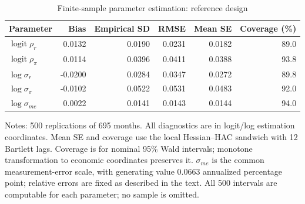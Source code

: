 \begin{table}[!htbp]
\centering
\caption{Finite-sample parameter estimation: reference design}
\label{oa:tab_parameter_mc_reference}
\begin{threeparttable}
\small
\begin{tabular*}{\textwidth}{@{\extracolsep{\fill}}lrrrrr}
\toprule
Parameter & Bias & Empirical SD & RMSE & Mean SE & Coverage (\%) \\
\midrule
$\operatorname{logit}\rho_r$ & 0.0132 & 0.0190 & 0.0231 & 0.0182 & 89.0 \\
$\operatorname{logit}\rho_\pi$ & 0.0114 & 0.0396 & 0.0411 & 0.0388 & 93.8 \\
$\log\sigma_r$ & -0.0200 & 0.0284 & 0.0347 & 0.0272 & 89.8 \\
$\log\sigma_\pi$ & -0.0102 & 0.0522 & 0.0531 & 0.0483 & 92.0 \\
$\log\sigma_{me}$ & 0.0022 & 0.0141 & 0.0143 & 0.0144 & 94.0 \\
\bottomrule
\end{tabular*}
\begin{tablenotes}[flushleft]
\footnotesize
\item Notes: 500 replications of 695 months. All diagnostics are in logit/log estimation coordinates. Mean SE and coverage use the local Hessian--HAC sandwich with 12 Bartlett lags. Coverage is for nominal 95\% Wald intervals; monotone transformation to economic coordinates preserves it. $\sigma_{me}$ is the common measurement-error scale, with generating value 0.0663 annualized percentage point; relative errors are fixed as described in the text. All 500 intervals are computable for each parameter; no sample is omitted.
\end{tablenotes}
\end{threeparttable}
\end{table}
